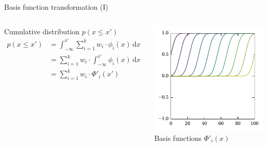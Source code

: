\documentclass[aspectratio=169]{beamer}
\begin{document}
\begin{frame}{Basis function transformation (I)}
\begin{columns}[T]
	\begin{block}{Cumulative distribution $p(x \leq x')$}
	\begin{align*}
		p(x \leq x')
			&= \int_{-\infty}^{x'} \sum_{i = 1}^k w_i \cdot \phi_i(x) \,\mathrm{d}x\\ 
			&= \sum_{i = 1}^k w_i \cdot \int_{-\infty}^{x'} \phi_i(x) \,\mathrm{d}x\\
			&= \sum_{i = 1}^k w_i \cdot \Phi'_i(x')
	\end{align*}
	\end{block}
	\centering
	\includegraphics[width=\textwidth]{media/basis_gaussian_cum.pdf}\\
	\footnotesize Basis functions $\Phi'_i(x)$
\end{columns}
\end{frame}
\end{document}
